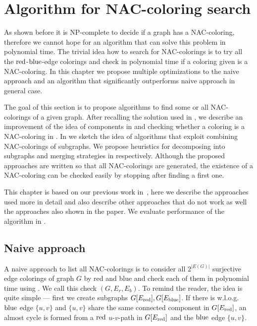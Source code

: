 \chapter{Algorithm for NAC-coloring search}%
\label{chapter:alg}

\begin{chapterabstract}

	As shown before it is NP-complete to decide if a graph has a NAC-coloring,
	therefore we cannot hope for an algorithm that can solve this problem in polynomial time.
	The trivial idea how to search for NAC-colorings is to
	try all the \( \text{red} \)-\( \text{blue} \)-edge colorings
	and check in polynomial time if a coloring given is a NAC-coloring.
	In this chapter we propose multiple optimizations to the naive approach
	and an algorithm that significantly outperforms naive approach in general case.

\end{chapterabstract}

The goal of this section is to propose algorithms to find some or all NAC-colorings of a given graph.
After recalling the solution used in \flexrilog{},
we describe an improvement of the idea of \trcon{} components in 
and checking whether a coloring is a NAC-coloring in .
In  we sketch the idea of algorithms that
exploit combining NAC-colorings of subgraphs.
We propose heuristics for decomposing into subgraphs and merging strategies
in  respectively.
Although the proposed approaches are written so that all NAC-colorings are generated,
the existence of a NAC-coloring can be checked easily by stopping after finding a first one.

This chapter is based on our previous work in~\cite{my_paper},
here we describe the approaches used more in detail
and also describe other approaches that do not work as well the approaches also
shown in the paper. We evaluate performance of the algorithm in .

\section{Naive approach}

A naive approach to list all NAC-colorings is to consider
all $2^{|E(G)|}$ surjective edge colorings of graph $G$ by red and blue
and check each of them in polynomial time using .
We call this check \IsNACColoring{}$(G, E_r, E_b)$.
To remind the reader, the idea is quite simple
--- first we create subgraphs \( G[E_{\text{red}}], G[E_{\text{blue}}] \).
If there is w.l.o.g.\ \( \text{blue} \) edge \( \{u, v\} \)
and \( \{u, v\} \) share the same connected component in \( G[E_{\text{red}}] \),
an almost cycle is formed from a \( \text{red} \) \( u \)-\( v \)-path in \( G[E_{\text{red}}] \)
and the \( \text{blue} \) edge \( \{u, v\} \).

